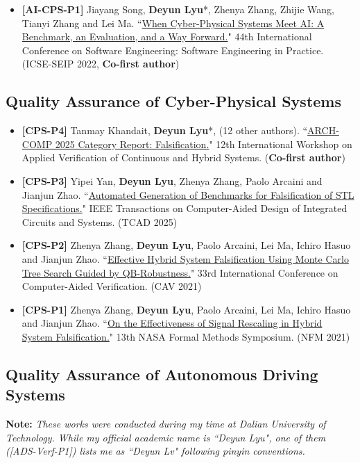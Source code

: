 \documentclass[11pt,a4paper]{moderncv}        %
\newcommand{\highlight}[1]{\textcolor{deepPurple}{\textbf{#1}}}
\begin{document}
\begin{itemize}
    \item \hypertarget{pub:AI-CPS-P1}{}\textbf{[AI-CPS-P1]} Jiayang Song, \textbf{Deyun Lyu}*, Zhenya Zhang, Zhijie Wang, Tianyi Zhang and Lei Ma. ``\href{https://dl.acm.org/doi/10.1145/3510457.3513049}{When Cyber-Physical Systems Meet AI: A Benchmark, an Evaluation, and a Way Forward.}" 44th International Conference on Software Engineering: Software Engineering in Practice. (ICSE-SEIP 2022, \highlight{Co-first author})
\end{itemize}

\subsection{Quality Assurance of Cyber-Physical Systems}

\begin{itemize}
    \item \textbf{[CPS-P4]} Tanmay Khandait, \textbf{Deyun Lyu}*, (12 other authors). ``\href{https://easychair.org/publications/paper/xX5W/open}{ARCH-COMP 2025 Category Report: Falsification.}" 12th International Workshop on Applied Verification of Continuous and Hybrid Systems. (\highlight{Co-first author})
    \item \hypertarget{pub:CPS-P3}{}\textbf{[CPS-P3]} Yipei Yan, \textbf{Deyun Lyu}, Zhenya Zhang, Paolo Arcaini and Jianjun Zhao. ``\href{https://ieeexplore.ieee.org/document/10922764}{Automated Generation of Benchmarks for Falsification of STL Specifications.}" IEEE Transactions on Computer-Aided Design of Integrated Circuits and Systems. (TCAD 2025)
    \item \hypertarget{pub:CPS-P2}{}\textbf{[CPS-P2]} Zhenya Zhang, \textbf{Deyun Lyu}, Paolo Arcaini, Lei Ma, Ichiro Hasuo and Jianjun Zhao. ``\href{https://link.springer.com/chapter/10.1007/978-3-030-81685-8_29}{Effective Hybrid System Falsification Using Monte Carlo Tree Search Guided by QB-Robustness.}" 33rd International Conference on Computer-Aided Verification. (CAV 2021)
    \item \textbf{[CPS-P1]} Zhenya Zhang, \textbf{Deyun Lyu}, Paolo Arcaini, Lei Ma, Ichiro Hasuo and Jianjun Zhao. ``\href{https://link.springer.com/chapter/10.1007/978-3-030-76384-8_24}{On the Effectiveness of Signal Rescaling in Hybrid System Falsification.}" 13th NASA Formal Methods Symposium. (NFM 2021)
\end{itemize}

\subsection{Quality Assurance of Autonomous Driving Systems} 
\noindent \textbf{Note:} \textit{These works were conducted during my time at Dalian University of Technology. While my official academic name is ``Deyun Lyu", one of them ([ADS-Verf-P1]) lists me as ``Deyun Lv" following pinyin conventions.}
\end{document}
